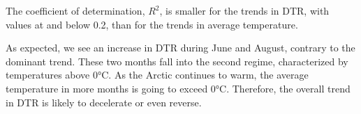 The coefficient of determination, $R^2$, is smaller for the trends in DTR, with values at and below 0.2, than for the trends in average temperature.

As expected, we see an increase in DTR during June and August, contrary to the dominant trend. These two months fall into the second regime, characterized by temperatures above 0°C. As the Arctic continues to warm, the average temperature in more months is going to exceed 0°C. Therefore, the overall trend in DTR is likely to decelerate or even reverse.



